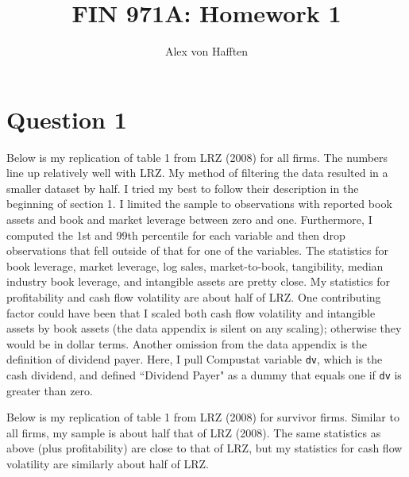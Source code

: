 \documentclass{article}
\title{FIN 971A: Homework 1}
\author{Alex von Hafften }
\begin{document}
\maketitle

\section{Question 1}

Below is my replication of table 1 from LRZ (2008) for all firms.  The numbers line up relatively well with LRZ.  My method of filtering the data resulted in a smaller dataset by half.  I tried my best to follow their description in the beginning of section 1.  I limited the sample to observations with reported book assets and book and market leverage between zero and one.  Furthermore, I computed the 1st and 99th percentile for each variable and then drop observations that fell outside of that for one of the variables. The statistics for book leverage, market leverage, log sales, market-to-book, tangibility, median industry book leverage, and intangible assets are pretty close.  My statistics for profitability and cash flow volatility are about half of LRZ.  One contributing factor could have been that I scaled both cash flow volatility and intangible assets by book assets (the data appendix is silent on any scaling); otherwise they would be in dollar terms.  Another omission from the data appendix is the definition of dividend payer.  Here, I pull Compustat variable \texttt{dv}, which is the cash dividend, and defined ``Dividend Payer" as a dummy that equals one if \texttt{dv} is greater than zero.

\bigskip



\bigskip

Below is my replication of table 1 from LRZ (2008) for survivor firms. Similar to all firms, my sample is about half that of LRZ (2008). The same statistics as above (plus profitability) are close to that of LRZ, but my statistics for cash flow volatility are similarly about half of LRZ.

\bigskip



\pagebreak
\end{document}
